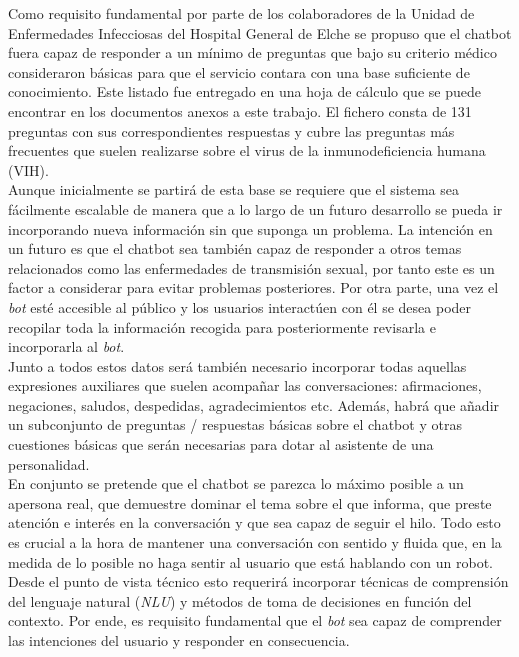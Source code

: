 Como requisito fundamental por parte de los colaboradores de la Unidad de Enfermedades Infecciosas del Hospital General de Elche se propuso que el chatbot fuera capaz de responder a un mínimo de preguntas que bajo su criterio médico consideraron básicas para que el servicio contara con una base suficiente de conocimiento. Este listado fue entregado en una hoja de cálculo que se puede encontrar en los documentos anexos a este trabajo. El fichero consta de 131 preguntas con sus correspondientes respuestas y cubre las preguntas más frecuentes que suelen realizarse sobre el virus de la inmunodeficiencia humana (VIH). \\

Aunque inicialmente se partirá de esta base se requiere que el sistema sea fácilmente escalable de manera que a lo largo de un futuro desarrollo se pueda ir incorporando nueva información sin que suponga un problema. La intención en un futuro es que el chatbot sea también capaz de responder a otros temas relacionados como las enfermedades de transmisión sexual, por tanto este es un factor a considerar para evitar problemas posteriores. Por otra parte, una vez el \textit{bot} esté accesible al público y los usuarios interactúen con él se desea poder recopilar toda la información recogida para posteriormente revisarla e incorporarla al \textit{bot}.\\

Junto a todos estos datos será también necesario incorporar todas aquellas expresiones auxiliares que suelen acompañar las conversaciones: afirmaciones, negaciones, saludos, despedidas, agradecimientos etc. Además, habrá que añadir un subconjunto de preguntas / respuestas básicas sobre el chatbot y otras cuestiones básicas que serán necesarias para dotar al asistente de una personalidad.\\

En conjunto se pretende que el chatbot se parezca lo máximo posible a un apersona real, que demuestre dominar el tema sobre el que informa, que preste atención e interés en la conversación y que sea capaz de seguir el hilo. Todo esto es crucial a la hora de mantener una conversación con sentido y fluida que, en la medida de lo posible no haga sentir al usuario que está hablando con un robot. Desde el punto de vista técnico esto requerirá incorporar técnicas de comprensión del lenguaje natural (\textit{NLU}) y métodos de toma de decisiones en función del contexto. Por ende, es requisito fundamental que el \textit{bot} sea capaz de comprender las intenciones del usuario y responder en consecuencia.\\

